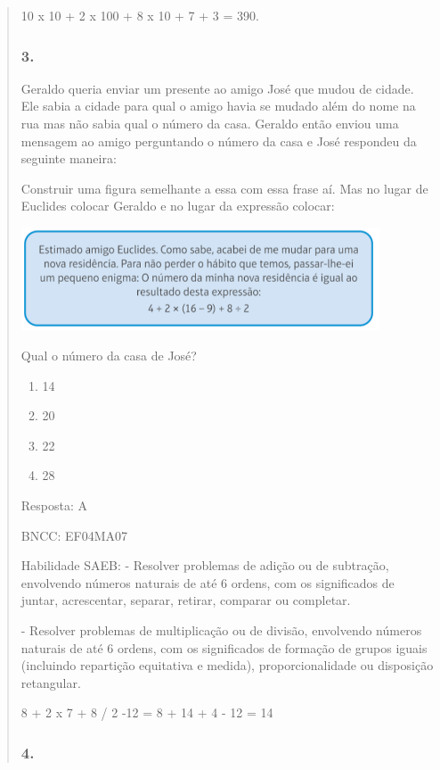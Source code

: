 \begin{enumerate}
\begin{escolha}
\begin{enumerate}
\begin{itemize}
\begin{itemize}
\begin{escolha}
\begin{quote}
\begin{escolha}
{10 x 10 + 2 x 100 + 8 x 10 + 7 + 3 = 390.

\subsubsection{3. }\label{section-189}

Geraldo queria enviar um presente ao amigo José que mudou de cidade. Ele
sabia a cidade para qual o amigo havia se mudado além do nome na rua mas
não sabia qual o número da casa. Geraldo então enviou uma mensagem ao
amigo perguntando o número da casa e José respondeu da seguinte maneira:

Construir uma figura semelhante a essa com essa frase aí. Mas no lugar
de Euclides colocar Geraldo e no lugar da expressão colocar:

\includegraphics[width=4.19231in,height=1.20373in]{media/image165.png}

Qual o número da casa de José?

\begin{enumerate}
\def\labelenumi{\alph{enumi})}
\item
  14
\item
  20
\item
  22
\item
  28
\end{enumerate}

Resposta: A

BNCC: EF04MA07

Habilidade SAEB: - Resolver problemas de adição ou de subtração,
envolvendo números naturais de até 6 ordens, com os significados de
juntar, acrescentar, separar, retirar, comparar ou completar.

- Resolver problemas de multiplicação ou de divisão, envolvendo números
naturais de até 6 ordens, com os significados de formação de grupos
iguais (incluindo repartição equitativa e medida), proporcionalidade ou
disposição retangular.

8 + 2 x 7 + 8 / 2 -12 = 8 + 14 + 4 - 12 = 14

\subsubsection{4. }\label{section-190}

}
\end{escolha}
\end{quote}
\end{escolha}
\end{itemize}
\end{itemize}
\end{enumerate}
\end{escolha}
\end{enumerate}
